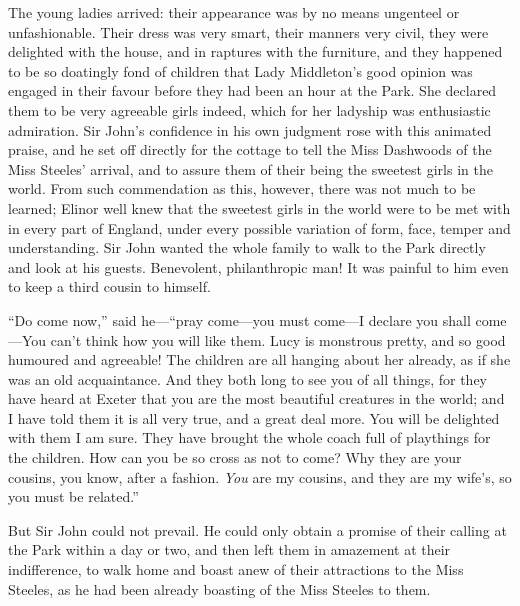 \documentclass{article}
\begin{document}
The young ladies arrived: their appearance was by
no means ungenteel or unfashionable.  Their dress was
very smart, their manners very civil, they were delighted
with the house, and in raptures with the furniture,
and they happened to be so doatingly fond of children
that Lady Middleton's good opinion was engaged in their
favour before they had been an hour at the Park.
She declared them to be very agreeable girls indeed,
which for her ladyship was enthusiastic admiration.
Sir John's confidence in his own judgment rose with this
animated praise, and he set off directly for the cottage
to tell the Miss Dashwoods of the Miss Steeles' arrival,
and to assure them of their being the sweetest girls
in the world.  From such commendation as this, however,
there was not much to be learned; Elinor well knew
that the sweetest girls in the world were to be met
with in every part of England, under every possible
variation of form, face, temper and understanding.
Sir John wanted the whole family to walk to the Park directly
and look at his guests.  Benevolent, philanthropic man!  It
was painful to him even to keep a third cousin to himself.

``Do come now,'' said he---``pray come---you must come---I
declare you shall come---You can't think how you will
like them.  Lucy is monstrous pretty, and so good humoured
and agreeable!  The children are all hanging about her already,
as if she was an old acquaintance.  And they both long
to see you of all things, for they have heard at Exeter
that you are the most beautiful creatures in the world;
and I have told them it is all very true, and a great
deal more.  You will be delighted with them I am sure.
They have brought the whole coach full of playthings
for the children.  How can you be so cross as not to come?
Why they are your cousins, you know, after a fashion.
\emph{You} are my cousins, and they are my wife's, so you must
be related.''

But Sir John could not prevail.  He could only obtain
a promise of their calling at the Park within a day or two,
and then left them in amazement at their indifference,
to walk home and boast anew of their attractions to the
Miss Steeles, as he had been already boasting of the Miss
Steeles to them.
\end{document}
